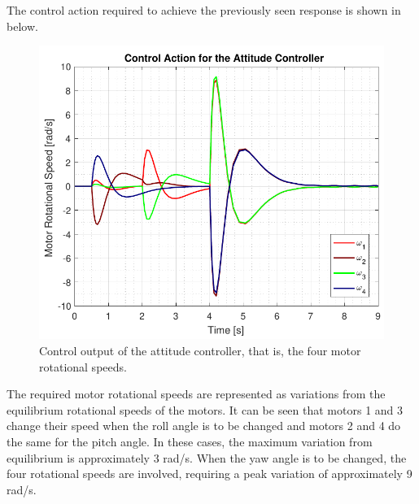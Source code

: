 The control action required to achieve the previously seen response is shown in below. 
\begin{figure}[H]
	\centering
	\includegraphics[scale=0.65]{figures/simAttitudeControlOutput}
	\caption{Control output of the attitude controller, that is, the four motor rotational speeds.}
	\label{fig:AttitudeControllerOutput}
\end{figure}
The required motor rotational speeds are represented as variations from the equilibrium rotational speeds of the motors. It can be seen that motors 1 and 3 change their speed when the roll angle is to be changed and motors 2 and 4 do the same for the pitch angle. In these cases, the maximum variation from equilibrium is approximately 3 rad/s. When the yaw angle is to be changed, the four rotational speeds are involved, requiring a peak variation of approximately 9 rad/s. 